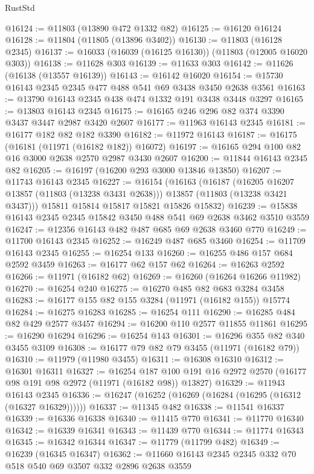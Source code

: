 \begin{lexlean}{RustStd}
\begin{coremodule}
@16124 := @11803 (@13890 @472 @1332 @82)
@16125 := @16120 @16124
@16128 := @11804 (@11805 (@13896 @3402))
@16130 := @11803 (@16128 @2345)
@16137 := @16033 (@16039 (@16125 @16130)) (@11803 (@12005 @16020 @303))
@16138 := @11628 @303
@16139 := @11633 @303
@16142 := @11626 (@16138 (@13557 @16139))
@16143 := @16142 @16020
@16154 := @15730 @16143 @2345 @2345 @477 @488 @541 @69 @3438 @3450 @2638 @3561
@16163 := @13790 @16143 @2345 @438 @474 @1332 @191 @3438 @3448 @3297
@16165 := @13803 @16143 @2345
@16175 := @16165 @246 @296 @82 @374 @3390 @3437 @3447 @2987 @3420 @2607
@16177 := @11963 @16143 @2345
@16181 := @16177 @182 @82 @182 @3390
@16182 := @11972 @16143
@16187 := @16175 (@16181 (@11971 (@16182 @182)) @16072)
@16197 := @16165 @294 @100 @82 @16 @3000 @2638 @2570 @2987 @3430 @2607
@16200 := @11844 @16143 @2345 @82
@16205 := @16197 (@16200 @293 @3000 @13846 @13850)
@16207 := @11743 @16143 @2345
@16227 := @16154
    (@16163
      (@16187
        (@16205 @16207 @13857 (@11803 (@13238 @3431 @2638)))
        @13857
        (@11803 (@13238 @3421 @3437)))
      @15811
      @15814
      @15817
      @15821
      @15826
      @15832)
@16239 := @15838 @16143 @2345 @2345 @15842 @3450 @488 @541 @69 @2638 @3462 @3510 @3559
@16247 := @12356 @16143 @482 @487 @685 @69 @2638 @3460 @770
@16249 := @11700 @16143 @2345
@16252 := @16249 @487 @685 @3460
@16254 := @11709 @16143 @2345
@16255 := @16254 @133
@16260 := @16255 @486 @157 @684 @2592 @3459
@16263 := @16177 @62 @157 @62
@16264 := @16263 @2592
@16266 := @11971 (@16182 @62)
@16269 := @16260 (@16264 @16266 @11982)
@16270 := @16254 @240
@16275 := @16270 @485 @82 @683 @3284 @3458
@16283 := @16177 @155 @82 @155 @3284 (@11971 (@16182 @155)) @15774
@16284 := @16275 @16283
@16285 := @16254 @111
@16290 := @16285 @484 @82 @429 @2577 @3457
@16294 := @16200 @110 @2577 @11855 @11861
@16295 := @16290 @16294
@16296 := @16254 @143
@16301 := @16296 @355 @82 @340 @3455 @3109
@16308 := @16177 @79 @82 @79 @3455 (@11971 (@16182 @79))
@16310 := @11979 (@11980 @3455)
@16311 := @16308 @16310
@16312 := @16301 @16311
@16327 := @16254
    @187
    @100
    @191
    @16
    @2972
    @2570
    (@16177 @98 @191 @98 @2972 (@11971 (@16182 @98)) @13827)
@16329 := @11943 @16143 @2345
@16336 := @16247 (@16252 (@16269 (@16284 (@16295 (@16312 (@16327 @16329))))))
@16337 := @11345 @482
@16338 := @11541 @16337
@16339 := @16336 @16338
@16340 := @11415 @770
@16341 := @11770 @16340
@16342 := @16339 @16341
@16343 := @11439 @770
@16344 := @11774 @16343
@16345 := @16342 @16344
@16347 := @11779 (@11799 @482)
@16349 := @16239 (@16345 @16347)
@16362 := @11660 @16143 @2345 @2345 @332 @70 @518 @540 @69 @3507 @332 @2896 @2638 @3559

\end{coremodule}
\end{lexlean}
